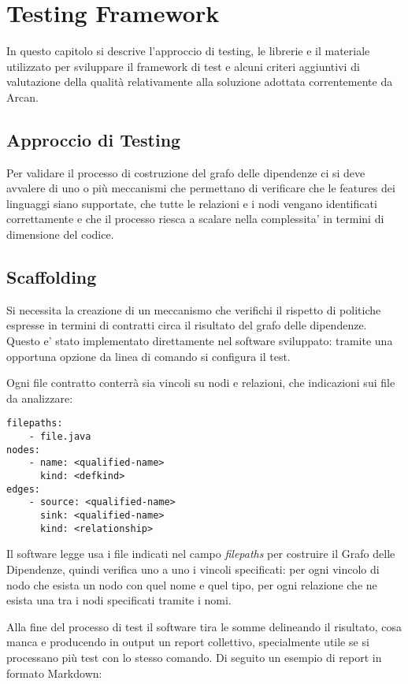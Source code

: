 \chapter{Testing Framework}

In questo capitolo si descrive l'approccio di testing, le librerie e il materiale utilizzato per sviluppare il framework di test e alcuni criteri aggiuntivi di valutazione della qualit\`a relativamente alla soluzione adottata correntemente da Arcan.

\section{Approccio di Testing}

Per validare il processo di costruzione del grafo delle dipendenze ci si deve avvalere di uno o pi\`u meccanismi che permettano di verificare che le features dei linguaggi siano supportate, che tutte le relazioni e i nodi vengano identificati correttamente e che il processo riesca a scalare nella complessita' in termini di dimensione del codice.

\section{Scaffolding}

Si necessita la creazione di un meccanismo che verifichi il rispetto di politiche espresse in termini di contratti circa il risultato del grafo delle dipendenze. Questo e' stato implementato direttamente nel software sviluppato: tramite una opportuna opzione da linea di comando si configura il test.

Ogni file contratto conterr\`a sia vincoli su nodi e relazioni, che indicazioni sui file da analizzare:

\begin{lstlisting}
filepaths:
    - file.java
nodes:
    - name: <qualified-name>
      kind: <defkind>
edges:
    - source: <qualified-name>
      sink: <qualified-name>
      kind: <relationship>
\end{lstlisting}

Il software legge usa i file indicati nel campo \emph{filepaths} per costruire il Grafo delle Dipendenze, quindi verifica uno a uno i vincoli specificati: per ogni vincolo di nodo che esista un nodo con quel nome e quel tipo, per ogni relazione che ne esista una tra i nodi specificati tramite i nomi.

Alla fine del processo di test il software tira le somme delineando il risultato, cosa manca e producendo in output un report collettivo, specialmente utile se si processano pi\`u test con lo stesso comando. Di seguito un esempio di report in formato Markdown:


